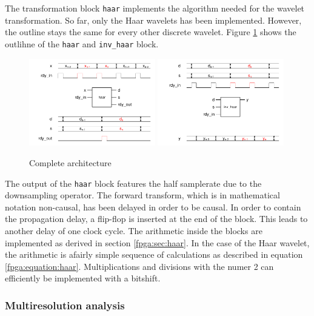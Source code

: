 \begin{refsection}
The transformation block \texttt{haar} implements the algorithm needed for the wavelet transformation.
So far, only the Haar wavelets has been implemented.
However, the outline stays the same for every other discrete wavelet.
Figure \ref{fpga:fig:haar} shows the outlihne of the \texttt{haar} and \texttt{inv\_haar} block.
\begin{figure}
	\centering
	\includegraphics[width=0.49\textwidth]{papers/fpga/images/haar.pdf} %
	\includegraphics[width=0.49\textwidth]{papers/fpga/images/inv_haar.pdf}
	\caption{Complete architecture \label{fpga:fig:haar}}
\end{figure}
The output of the \texttt{haar} block features the half samplerate due to the downsampling operator.
The forward transform, which is in mathematical notation non-causal, has been delayed in order to be causal.
In order to contain the propagation delay, a flip-flop is inserted at the end of the block.
This leads to another delay of one clock cycle.
The arithmetic inside the blocks are implemented as derived in section \ref{fpga:sec:haar}.
In the case of the Haar wavelet, the arithmetic is afairly simple sequence of calculations as  described in equation \ref{fpga:equation:haar}.
Multiplications and divisions with the numer 2 can efficiently be implemented with a bitshift.




\subsubsection{Multiresolution analysis}


\end{refsection}
